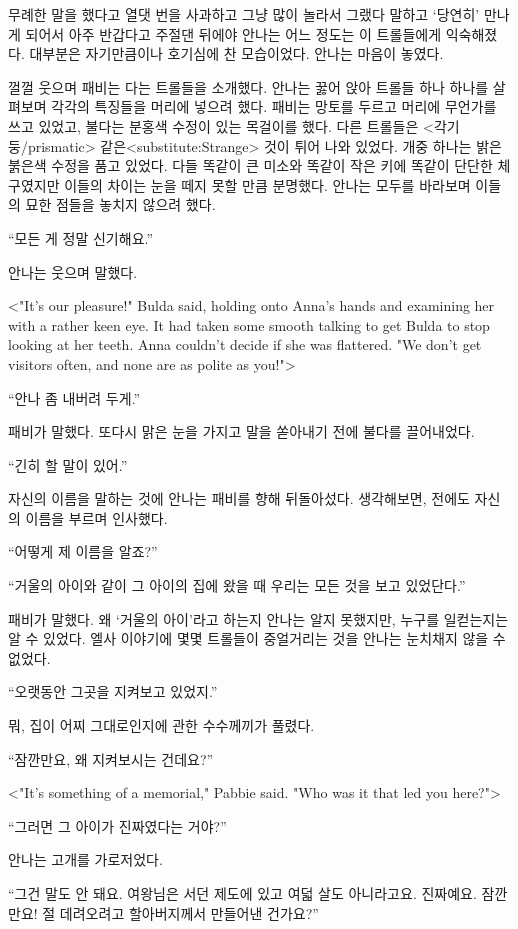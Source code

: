 무례한 말을 했다고 열댓 번을 사과하고 그냥 많이 놀라서 그랬다 말하고 `당연히' 만나게 되어서 아주 반갑다고 주절댄 뒤에야 안나는 어느 정도는 이 트롤들에게 익숙해졌다. 대부분은 자기만큼이나 호기심에 찬 모습이었다. 안나는 마음이 놓였다.

껄껄 웃으며 패비는 다는 트롤들을 소개했다. 안나는 꿇어 앉아 트롤들 하나 하나를 살펴보며 각각의 특징들을 머리에 넣으려 했다. 패비는 망토를 두르고 머리에 무언가를 쓰고 있었고, 불다는 분홍색 수정이 있는 목걸이를 했다. 다른 트롤들은 <각기둥/prismatic> 같은<substitute:Strange> 것이 튀어 나와 있었다. 개중 하나는 밝은 붉은색 수정을 품고 있었다. 다들 똑같이 큰 미소와 똑같이 작은 키에 똑같이 단단한 체구였지만 이들의 차이는 눈을 떼지 못할 만큼 분명했다. 안나는 모두를 바라보며 이들의 묘한 점들을 놓치지 않으려 했다.

``모든 게 정말 신기해요.''

안나는 웃으며 말했다.

<"It's our pleasure!" Bulda said, holding onto Anna's hands and examining her with a rather keen eye. It had taken some smooth talking to get Bulda to stop looking at her teeth. Anna couldn't decide if she was flattered. "We don't get visitors often, and none are as polite as you!">

``안나 좀 내버려 두게.''

패비가 말했다. 또다시 맑은 눈을 가지고 말을 쏟아내기 전에 불다를 끌어내었다.

``긴히 할 말이 있어.''

자신의 이름을 말하는 것에 안나는 패비를 향해 뒤돌아섰다. 생각해보면, 전에도 자신의 이름을 부르며 인사했다.

``어떻게 제 이름을 알죠?''

``거울의 아이와 같이 그 아이의 집에 왔을 때 우리는 모든 것을 보고 있었단다.''

패비가 말했다. 왜 `거울의 아이'라고 하는지 안나는 알지 못했지만, 누구를 일컫는지는 알 수 있었다. 엘사 이야기에 몇몇 트롤들이 중얼거리는 것을 안나는 눈치채지 않을 수 없었다.

``오랫동안 그곳을 지켜보고 있었지.''

뭐, 집이 어찌 그대로인지에 관한 수수께끼가 풀렸다.

``잠깐만요, 왜 지켜보시는 건데요?''

<"It's something of a memorial," Pabbie said. "Who was it that led you here?">

``그러면 그 아이가 진짜였다는 거야?''

안나는 고개를 가로저었다.

``그건 말도 안 돼요. 여왕님은 서던 제도에 있고 여덟 살도 아니라고요. 진짜예요. 잠깐만요! 절 데려오려고 할아버지께서 만들어낸 건가요?''

